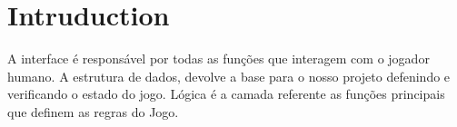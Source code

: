 \hypertarget{index_intro_sec}{}\section{Intruduction}\label{index_intro_sec}
A interface é responsável por todas as funções que interagem com o jogador humano. A estrutura de dados, devolve a base para o nosso projeto defenindo e verificando o estado do jogo. Lógica é a camada referente as funções principais que definem as regras do Jogo. 